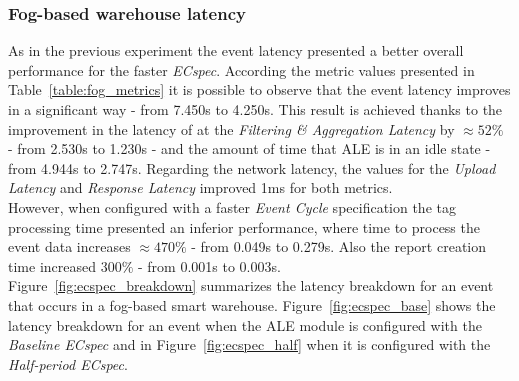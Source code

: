 \subsubsection{Fog-based warehouse latency}
\label{subs:eval_exp_latency_ecspec}
As in the previous experiment the event latency presented a better overall performance for the
faster \textit{ECspec}. According the metric values presented in Table~\ref{table:fog_metrics} it is
possible to observe that the event latency improves in a significant way - from 7.450s to 4.250s. This
result is achieved thanks to the improvement in the latency of at the \textit{Filtering \& Aggregation Latency}
by $\approx52\%$ - from 2.530s to 1.230s - and the amount of time that \gls{ALE} is in an idle state -
from 4.944s to 2.747s. Regarding the network latency, the values for the \textit{Upload Latency}
and \textit{Response Latency} improved 1ms for both metrics.\\



However, when configured with a faster \textit{Event Cycle} specification the tag processing time
presented an inferior performance, where time to process the event data increases $\approx470\%$
- from 0.049s to 0.279s. Also the report creation time increased $300\%$ - from 0.001s to 0.003s.\\

Figure~\ref{fig:ecspec_breakdown} summarizes the latency breakdown for an event that occurs in a fog-based
smart warehouse. Figure~\ref{fig:ecspec_base} shows the latency breakdown for an event when the
\gls{ALE} module is configured with the \textit{Baseline ECspec} and in Figure~\ref{fig:ecspec_half}
when it is configured with the \textit{Half-period ECspec}.\\

